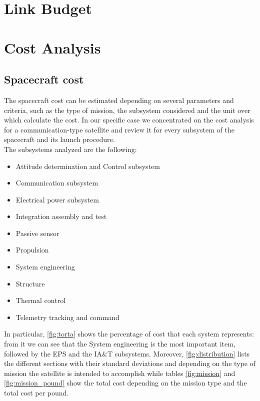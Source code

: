 \documentclass[11pt,a4paper,titlepage]{article}
\begin{document}
\section{Link Budget}
\lipsum[1]

\section{Cost Analysis}
	\subsection{Spacecraft cost}
The spacecraft cost can be estimated depending on several parameters and criteria, such as the type of mission, the subsystem considered and the unit over which calculate the cost. In our specific case we concentrated on the cost analysis for a communication-type satellite and review it for every subsystem of the spacecraft and its launch procedure.\\

The subsystems analyzed  are the following:
\begin{itemize}
\item Attitude determination and Control subsystem
\item Communication subsystem
\item Electrical power subsystem
\item Integration assembly and test
\item Passive sensor
\item Propulsion
\item System engineering
\item Structure
\item Thermal control
\item Telemetry tracking and command
\end{itemize}
In particular, \autoref{fig:torta} shows the percentage of cost that each system represents: from it we can see that the System engineering is the most important item, followed by the EPS and the IA\&T subsystems. Moreover, \autoref{fig:distribution} lists the different sections with their standard deviations and depending on the type of mission the satellite is intended to accomplish while tables \ref{fig:mission} and \ref{fig:mission_pound} show the total cost depending on the mission type and the total cost per pound.
\end{document}
